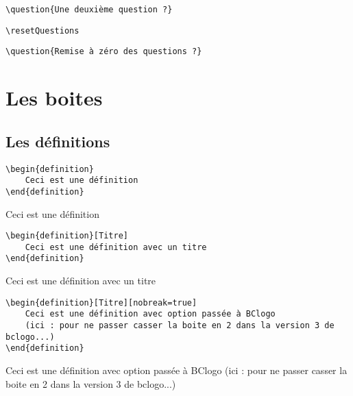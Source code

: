 \documentclass[a4paper,10pt]{article}
\begin{document}
		
		\verb!\question{Une deuxième question ?}!
		
		
		\verb!\resetQuestions!
		
		\verb!\question{Remise à zéro des questions ?}!
		
		\resetQuestions
		
	\section{Les boites}
	
		\subsection{Les définitions}
		
		\begin{verbatim}
\begin{definition}
	Ceci est une définition
\end{definition}
		\end{verbatim}

\begin{definition}
	Ceci est une définition
\end{definition}

		\begin{verbatim}
\begin{definition}[Titre]
	Ceci est une définition avec un titre
\end{definition}
		\end{verbatim}
		
\begin{definition}[Titre]
	Ceci est une définition avec un titre
\end{definition}


		\begin{verbatim}
\begin{definition}[Titre][nobreak=true]
	Ceci est une définition avec option passée à BClogo
	(ici : pour ne passer casser la boite en 2 dans la version 3 de bclogo...)
\end{definition}
		\end{verbatim}
		
\begin{definition}[Titre][nobreak=true]
	Ceci est une définition avec option passée à BClogo
	(ici : pour ne passer casser la boite en 2 dans la version 3 de bclogo...)
\end{definition}
\end{document}
